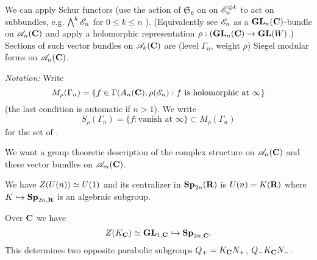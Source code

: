 We can apply Schur functors (use the action of $\mathfrak{S}_k$ on on $\mathscr{E}_n^{\otimes k}$ to act on subbundles, e.g. $\bigwedge^{k}\mathscr{E}_n$ for $0\le k\le n$ ). (Equivalently see $\mathscr{E}_n$ as a $\mathbf{GL}_n(\mathbf{C})$-bundle on $\mathscr{A}_n(\mathbf{C})$ and apply a holomorphic representation $\rho:(\GL_n(\C)\to \GL(W)$.)
Sections of such vector bundles on $\mathscr{A}_k(\mathbf{C})$ are (level $\Gamma_n$, weight $\rho$) Siegel modular forms on $\mathscr{A}_n(\mathbf{C})$.

\emph{Notation:} Write
\[
	M_\rho(\Gamma_n) = \left\{ f\in \Gamma(A_n(\mathbf{C}),\rho(\mathscr{E}_n):f\text{ is holomorphic at }\infty \right\} 
\]
(the last condition is automatic if $n>1$). We write
\[
S_\rho(\Gamma_n) = \{f:\text{vanish at }\infty\} \subset M_\rho(\Gamma_n)
\]
for the set of .

We want a group theoretic description of the complex structure on $\mathscr{A}_n(\mathbf{C})$ and these vector bundles on $\mathscr{A}_m(\mathbf{C})$.

We have $Z(U(n))\simeq U(1)$ and its centralizer in $\mathbf{Sp}_{2n}(\mathbf{R})$ is $U(n)=K(\mathbf{R})$ where $K\hookrightarrow \mathbf{Sp}_{2n,\mathbf{R}}$ is an algebraic subgroup.

Over $\mathbf{C}$ we have
\[
	Z(K_{\mathbf{C}}) \simeq \mathbf{GL}_{1,\mathbf{C}} \hookrightarrow \mathbf{Sp}_{2n,\mathbf{C}}.
\] 
This determines two opposite parabolic subgroups $Q_+=K_{\mathbf{C}}N_+$, $Q_{-}K_{\mathbf{C}}N_-$.

